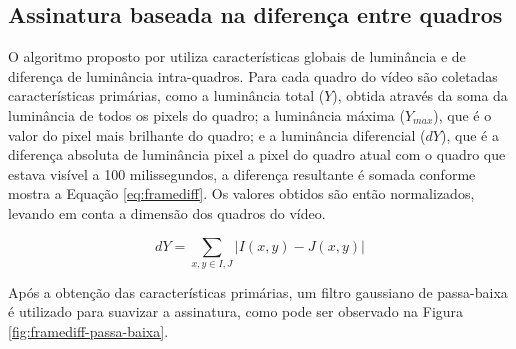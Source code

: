 \subsection{Assinatura baseada na diferença entre quadros}
\label{sec:framediff}

  O algoritmo proposto por  utiliza características globais de luminância e de diferença de luminância intra-quadros. Para cada quadro do vídeo são coletadas características primárias, como a luminância total ($Y$), obtida através da soma da luminância de todos os pixels do quadro; a luminância máxima ($Y_{max}$), que é o valor do pixel mais brilhante do quadro; e a luminância diferencial ($dY$), que é a diferença absoluta de luminância pixel a pixel do quadro atual com o quadro que estava visível a 100 milissegundos, a diferença resultante é somada conforme mostra a Equação \ref{eq:framediff}. Os valores obtidos são então normalizados, levando em conta a dimensão dos quadros do vídeo.
  
\begin{equation}
	\label{eq:framediff}
	dY = \sum_{x,y \in  I,J} |I(x,y) - J(x,y)|
\end{equation} 

   Após a obtenção das características primárias, um filtro gaussiano de passa-baixa é utilizado para suavizar a assinatura, como pode ser observado na Figura \ref{fig:framediff-passa-baixa}. %




